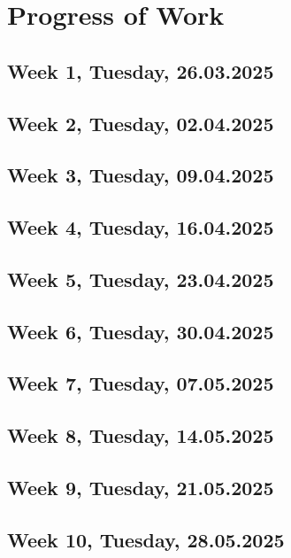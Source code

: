 \documentclass[12pt,fleqn,a4paper]{article}
\begin{document}
\newpage

\section{Progress of Work} %

\subsection{Week 1, Tuesday, 26.03.2025}

\subsection{Week 2, Tuesday, 02.04.2025}

\subsection{Week 3, Tuesday, 09.04.2025}

\subsection{Week 4, Tuesday, 16.04.2025}

\subsection{Week 5, Tuesday, 23.04.2025}

\subsection{Week 6, Tuesday, 30.04.2025}

\subsection{Week 7, Tuesday, 07.05.2025}

\subsection{Week 8, Tuesday, 14.05.2025}

\subsection{Week 9, Tuesday, 21.05.2025}

\subsection{Week 10, Tuesday, 28.05.2025}
\end{document}
